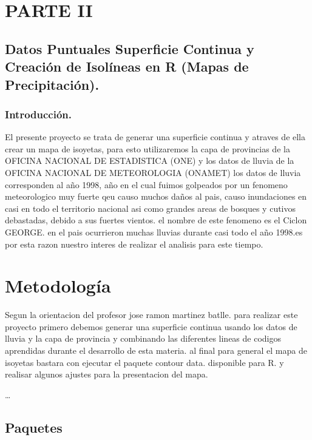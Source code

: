 \documentclass[11pt,]{article}
\begin{document}
\section{PARTE II}\label{parte-ii}

\subsection{Datos Puntuales Superficie Continua y Creación de Isolíneas
en R (Mapas de
Precipitación).}\label{datos-puntuales-superficie-continua-y-creaciuxf3n-de-isoluxedneas-en-r-mapas-de-precipitaciuxf3n.}

\subsubsection{Introducción.}\label{introducciuxf3n.-1}

El presente proyecto se trata de generar una superficie continua y
atraves de ella crear un mapa de isoyetas, para esto utilizaremos la
capa de provincias de la OFICINA NACIONAL DE ESTADISTICA (ONE) y los
datos de lluvia de la OFICINA NACIONAL DE METEOROLOGIA (ONAMET) los
datos de lluvia corresponden al año 1998, año en el cual fuimos
golpeados por un fenomeno meteorologico muy fuerte qeu causo muchos
daños al pais, causo inundaciones en casi en todo el territorio nacional
asi como grandes areas de bosques y cutivos debastadas, debido a sus
fuertes vientos. el nombre de este fenomeno es el Ciclon GEORGE. en el
pais ocurrieron muchas lluvias durante casi todo el año 1998.es por esta
razon nuestro interes de realizar el analisis para este tiempo.

\section{Metodología}\label{metodologuxeda-1}

Segun la orientacion del profesor jose ramon martinez batlle. para
realizar este proyecto primero debemos generar una superficie continua
usando los datos de lluvia y la capa de provincia y combinando las
diferentes lineas de codigos aprendidas durante el desarrollo de esta
materia. al final para general el mapa de isoyetas bastara con ejecutar
el paquete contour data. disponible para R. y realisar algunos ajustes
para la presentacion del mapa.

\ldots

\subsection{Paquetes}\label{paquetes}
\end{document}

